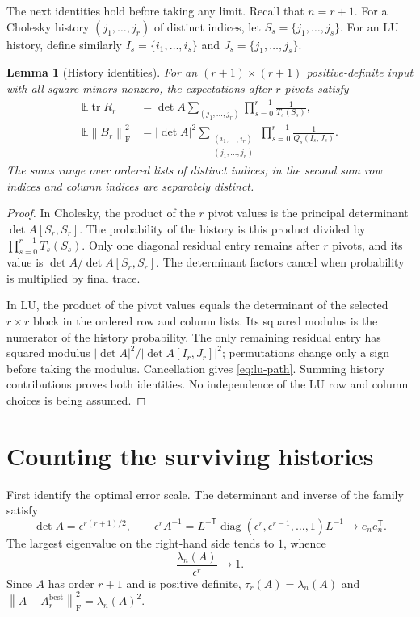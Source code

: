 \documentclass[11pt]{article}
\newtheorem{lemma}[theorem]{Lemma}
\theoremstyle{remark}
\DeclareMathOperator{\tr}{tr}
\DeclareMathOperator{\diag}{diag}
\newcommand{\E}{\mathbb E}
\newcommand{\F}{\mathrm F}
\newcommand{\eps}{\epsilon}
\newcommand{\norm}[1]{\left\lVert#1\right\rVert}
\begin{document}
The next identities hold before taking any limit. Recall that $n=r+1$.
For a Cholesky history $(j_1,\ldots,j_r)$ of distinct indices, let
$S_s=\{j_1,\ldots,j_s\}$. For an LU history, define similarly
$I_s=\{i_1,\ldots,i_s\}$ and $J_s=\{j_1,\ldots,j_s\}$.

\begin{lemma}[History identities]\label{lem:paths}
For an $(r+1)\times(r+1)$ positive-definite input with all square minors
nonzero, the expectations after $r$ pivots satisfy
\begin{align}
 \E\tr R_r
 &=\det A\sum_{(j_1,\ldots,j_r)}
     \prod_{s=0}^{r-1}\frac1{T_s(S_s)},\label{eq:chol-path}\\
 \E\norm{B_r}_{\F}^2
 &=|\det A|^2\sum_{\substack{(i_1,\ldots,i_r)\\(j_1,\ldots,j_r)}}
     \prod_{s=0}^{r-1}\frac1{Q_s(I_s,J_s)}.\label{eq:lu-path}
\end{align}
The sums range over ordered lists of distinct indices; in the second sum
row indices and column indices are separately distinct.
\end{lemma}
\begin{proof}
In Cholesky, the product of the $r$ pivot values is the principal determinant
$\det A[S_r,S_r]$. The probability of the history is this product divided by
$\prod_{s=0}^{r-1}T_s(S_s)$. Only one diagonal residual entry remains after
$r$ pivots, and its value is $\det A/\det A[S_r,S_r]$. The determinant factors
cancel when probability is multiplied by final trace.

In LU, the product of the pivot values equals the determinant of the selected
$r\times r$ block in the ordered row and column lists. Its squared modulus
is the numerator of the history probability. The only remaining residual
entry has squared modulus $|\det A|^2/|\det A[I_r,J_r]|^2$; permutations
change only a sign before taking the modulus. Cancellation gives
\eqref{eq:lu-path}. Summing history contributions proves both identities.
No independence of the LU row and column choices is being assumed.
\end{proof}

\section{Counting the surviving histories}

First identify the optimal error scale. The determinant and inverse of the
family satisfy
\begin{equation}\label{eq:det-inverse}
 \det A=\eps^{r(r+1)/2},\qquad
 \eps^r A^{-1}
 =L^{-\mathsf T}\diag(\eps^r,\eps^{r-1},\ldots,1)L^{-1}
 \longrightarrow e_n e_n^{\mathsf T}.
\end{equation}
The largest eigenvalue on the right-hand side tends to $1$, whence
\begin{equation}\label{eq:lambda-scale}
 \frac{\lambda_n(A)}{\eps^r}\longrightarrow1.
\end{equation}
Since $A$ has order $r+1$ and is positive definite,
$\tau_r(A)=\lambda_n(A)$ and
$\norm{A-A_r^{\mathrm{best}}}_{\F}^2=\lambda_n(A)^2$.
\end{document}
